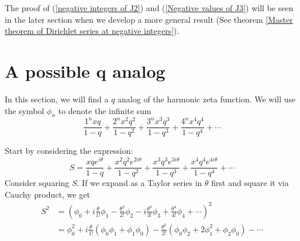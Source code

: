 \documentclass{article}
\begin{document}
The proof of (\ref{negative integers of J2}) and (\ref{Negative values of J3}) will be seen in the later section when we develop a more general result (See theorem \ref{Master theorem of Dirichlet series at negative integers}).

\section{A possible q analog}
In this section, we will find a $q$ analog of the harmonic zeta function. We will use the symbol $\phi_n$ to denote the infinite sum $$\frac{1^n xq}{1-q}+\frac{2^n x^2q^2}{1-q^2}+\frac{3^n x^3q^3}{1-q^3}+\frac{4^n x^4q^4}{1-q^4}+\cdots$$

Start by considering the expression:
$$S=\frac{xqe^{i\theta}}{1-q}+\frac{x^2q^2e^{2i\theta}}{1-q^2}+\frac{x^3q^3e^{3i\theta}}{1-q^3}+\frac{x^4q^4e^{4i\theta}}{1-q^4}+\cdots$$ Consider squaring $S$. 
If we expand as a Taylor series in $\theta$ first and square it via Cauchy product, we get \begin{align*}S^2& =\left(\phi_0+i\frac{\theta}{1!}\phi_1-\frac{\theta^2}{2!}\phi_2-i\frac{\theta^3}{3!}\phi_3+\frac{\theta^4}{4!}\phi_4+\cdots\right)^2\\ 
 &=\phi_0^2+i\frac{\theta}{1!}(\phi_0\phi_1+\phi_1\phi_0)-\frac{\theta^2}{2!}(\phi_0\phi_2+2\phi_1^2+\phi_2\phi_0)-\cdots\end{align*}
\end{document}
